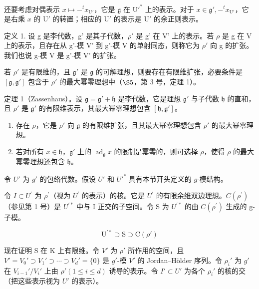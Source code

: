 还要考虑对偶表示 \(x \mapsto -^{t}x_{\mathrm{U}'}\)，它是 \(\mathfrak{g}\) 在 \(\mathrm{U}'^*\) 上的表示。对于 \(x \in \mathfrak{g}', -^{t}x_{\mathrm{U}'}\)，它是右乘 \(x\) 的 \(\mathrm{U}'\) 的转置；相应的 \(\mathrm{U}'\) 的表示是 \(\mathrm{U}'\) 的余正则表示。

定义 1. 设 g 是李代数，g' 是其子代数，\(\rho'\) 是 g' 在 V' 上的表示。若 \(\rho\) 是 g 在 V 上的表示，且存在从 g'-模 V' 到 g'-模 V 的单射同态，则称它为 \(\rho'\) 向 g 的扩张。我们也说 g-模 V 是 g'-模 V' 的扩张。

若 \(\rho'\) 是有限维的，且 \(\mathfrak{g}'\) 是 \(\mathfrak{g}\) 的可解理想，则要存在有限维扩张，必要条件是 \([\mathfrak{g},\mathfrak{g}']\) 包含于 \(\rho'\) 的最大幂零理想中（\(\S 5\)，第 3 号，定理 1）。

定理 1（Zassenhaus）。设 \(\mathfrak{g} = \mathfrak{g}' + \mathfrak{h}\) 是李代数，它是理想 \(\mathfrak{g}'\) 与子代数 \(\mathfrak{h}\) 的直和，且 \(\rho'\) 是 \(\mathfrak{g}'\) 的有限维表示，其最大幂零理想包含 \([\mathfrak{h},\mathfrak{g}']\)。

\begin{enumerate}
\def\labelenumi{(\alph{enumi})}
\item
  存在 \(\rho\)，它是 \(\rho'\) 向 \(\mathfrak{g}\) 的有限维扩张，且其最大幂零理想包含 \(\rho'\) 的最大幂零理想。
\item
  若对所有 \(x \in \mathfrak{h}\)，\(\mathfrak{g}'\) 上的 \(\operatorname{ad}_{\mathfrak{g}}x\) 的限制是幂零的，则可选择 \(\rho\)，使得 \(\rho\) 的最大幂零理想还包含 \(\mathfrak{h}\)。
\end{enumerate}

令 \(U'\) 为 \(g'\) 的包络代数。假设 \(U'\) 和 \(U'^*\) 具有本节开头定义的 \(g\)-模结构。

令 \(I \subset U^{\prime}\) 为 \(\rho^{\prime}\)（视为 \(U^{\prime}\) 的表示）的核。它是 \(U^{\prime}\) 的有限余维双边理想。\(C(\rho^{\prime})\)（参见第 1 号）是 \(U^{\prime*}\) 中与 I 正交的子空间。令 S 为 \(U^{\prime*}\) 的由 \(C(\rho^{\prime})\) 生成的 g-子模。

\[
\mathrm{U}^{\prime *} \supset \mathrm{S} \supset \mathrm{C}(\rho')
\]

现在证明 S 在 K 上有限维。令 \(V'\) 为 \(\rho'\) 所作用的空间，且 \(V' = V_{0}' \supset V_{1}' \supset \cdots \supset V_{d}' = \{0\}\) 是 \(g'\)-模 \(V'\) 的 Jordan--Hölder 序列。令 \(\rho_{i}'\) 为 \(g'\) 在 \(V_{i-1}'/V_{i}'\) 上由 \(\rho' (1 \leqslant i \leqslant d)\) 诱导的表示。令 \(I' \subset U'\) 为各个 \(\rho_{i}'\) 的核的交（把这些表示视为 \(U'\) 的表示）。

